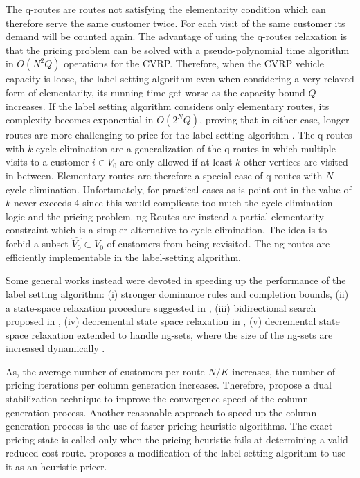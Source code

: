 The q-routes are routes not satisfying the elementarity condition which
can therefore serve the same customer twice. For
each visit of the same customer its demand will be counted again.
The advantage of using the q-routes relaxation is that the pricing problem
can be solved with a pseudo-polynomial time algorithm in $O(N^2 Q)$
operations for the CVRP.
Therefore, when the CVRP vehicle capacity is loose, the label-setting algorithm
even when considering a very-relaxed form of elementarity, its running
time get worse as the capacity bound $Q$ increases.
If the label setting algorithm considers only elementary routes,
its complexity becomes exponential in $O(2^N Q)$, proving that in
either case, longer routes are more challenging to price
for the label-setting algorithm \parencite{toth2014}.
The q-routes with $k$-cycle elimination are a generalization of the q-routes
in which multiple visits to a customer $i \in V_0$ are only allowed
if at least $k$ other vertices are visited in between.
Elementary routes are therefore a special case of q-routes with $N$-cycle elimination.
Unfortunately, for practical cases as is point out in \textcite{fukasawa2006} the value
of $k$ never exceeds 4 since this would complicate too much the cycle elimination logic
and the pricing problem.
ng-Routes are instead a partial elementarity constraint
which is a simpler alternative to cycle-elimination.
The idea is to forbid a subset $\hat{V_0} \subset V_0$ of customers from being revisited.
The ng-routes are efficiently implementable in the label-setting algorithm.





Some general works instead were devoted in speeding up the performance of the label
setting algorithm:
(i) stronger dominance rules and completion bounds,
(ii) a state-space relaxation procedure suggested in \textcite{christofides1981a},
(iii) bidirectional search proposed in \textcite{righini2006},
(iv) decremental state space relaxation in \textcite{boland2006, righini2008},
(v) decremental state space relaxation extended to handle ng-sets,
where the size of the ng-sets are increased dynamically \textcite{martinelli2014}.


As, the average number of customers per route $N / K$ increases,
the number of pricing iterations per column generation increases.
Therefore, \textcite{dumerle1999, pessoa2013} propose a dual stabilization
technique to improve the convergence speed of the column generation process.
Another reasonable approach to speed-up the column generation process
is the use of faster pricing heuristic algorithms. The exact
pricing state is called only when the pricing heuristic fails
at determining a valid reduced-cost route.
\textcite{fukasawa2006} proposes a modification of the label-setting
algorithm to use it as an heuristic pricer.



